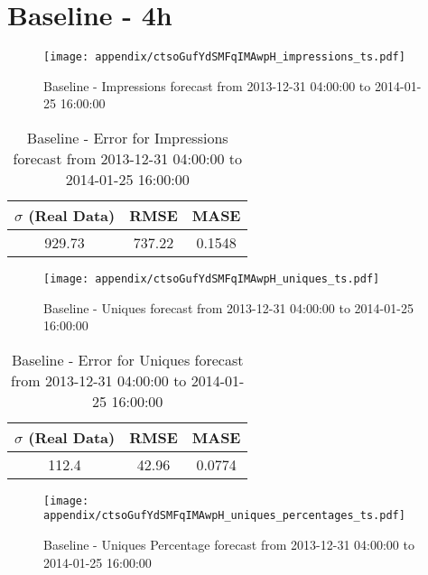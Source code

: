\section{Baseline - 4h}
\begin{figure}[H] \begin{center} \leavevmode
\texttt{[image: appendix/ctsoGufYdSMFqIMAwpH\_impressions\_ts.pdf]} \caption{
Baseline - Impressions forecast from 2013-12-31 04:00:00 to 2014-01-25 16:00:00} \label{fig:appendix/ctsoGufYdSMFqIMAwpH_impressions_ts.pdf} \end{center}
\end{figure}

\begin{table}[H]
\centering
\footnotesize
\begin{tabular}{ccc}
$\sigma$ (Real Data) & RMSE & MASE   \\ \hline
929.73 & 737.22 & 0.1548 \\
\end{tabular}

\vspace{0.5cm}

\caption{
Baseline - Error for Impressions forecast from 2013-12-31 04:00:00 to 2014-01-25 16:00:00}
\end{table}

\begin{figure}[H] \begin{center} \leavevmode
\texttt{[image: appendix/ctsoGufYdSMFqIMAwpH\_uniques\_ts.pdf]} \caption{
Baseline - Uniques forecast from 2013-12-31 04:00:00 to 2014-01-25 16:00:00} \label{fig:appendix/ctsoGufYdSMFqIMAwpH_uniques_ts.pdf} \end{center}
\end{figure}

\begin{table}[H]
\centering
\footnotesize
\begin{tabular}{ccc}
$\sigma$ (Real Data) & RMSE & MASE   \\ \hline
112.4 & 42.96 & 0.0774 \\
\end{tabular}

\vspace{0.5cm}

\caption{
Baseline - Error for Uniques forecast from 2013-12-31 04:00:00 to 2014-01-25 16:00:00}
\end{table}

\begin{figure}[H] \begin{center} \leavevmode
\texttt{[image: appendix/ctsoGufYdSMFqIMAwpH\_uniques\_percentages\_ts.pdf]} \caption{
Baseline - Uniques Percentage forecast from 2013-12-31 04:00:00 to 2014-01-25 16:00:00} \label{fig:appendix/ctsoGufYdSMFqIMAwpH_uniques_percentages_ts.pdf} \end{center}
\end{figure}


